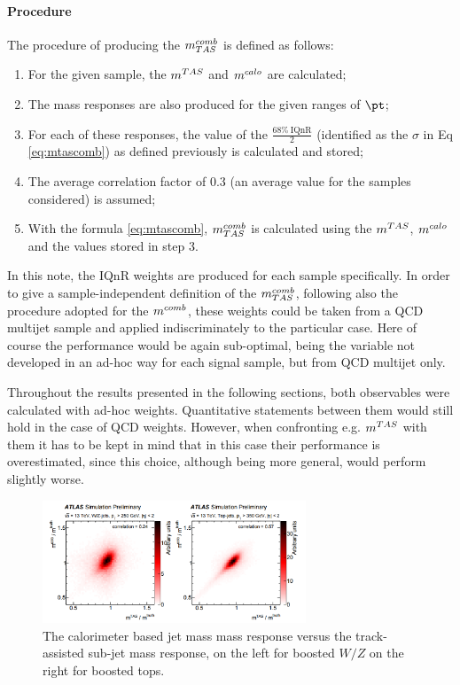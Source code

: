 \paragraph{Procedure}
The procedure of producing the $m^{comb}_{TAS}$ is defined as follows:
\begin{enumerate}
 \item For the given sample, the $\mtas$ and $\mcal$ are calculated;
 \item The mass responses are also produced for the given ranges of $\pt$;
 \item For each of these responses, the value of the $\frac{68\% \: \textrm{IQnR}}{2}$ (identified as the $\sigma$ in Eq \ref{eq:mtascomb}) as defined previously is calculated and stored;
 \item The average correlation factor of 0.3 (an average value for the samples considered) is assumed;
 \item With the formula \ref{eq:mtascomb}, $m^{comb}_{TAS}$ is calculated using the $\mtas$, $\mcal$ and the values stored in step 3.
\end{enumerate}


In this note, the IQnR weights are produced for each sample specifically. In order to give a sample-independent definition of the $m^{comb}_{TAS}$, following also the procedure adopted for the $m^{comb}$, these weights could be taken from a QCD multijet sample and applied indiscriminately to the particular case. Here of course the performance would be again sub-optimal, being the variable not developed in an ad-hoc way for each signal sample, but from QCD multijet only.

Throughout the results presented in the following sections, both observables were calculated with ad-hoc weights. Quantitative statements between them would still hold in the case of QCD weights. However, when confronting e.g. $\mtas$ with them it has to be kept in mind that in this case their performance is overestimated, since this choice, although being more general, would perform slightly worse.

\begin{figure}[!ht]
  \centering
      \includegraphics[width=0.7\textwidth]{jet_part/mcomb/mcomb2.png}
  \caption[$\mcal$ and $\mtas$ correlation plots]{The calorimeter based jet mass mass response versus the track-assisted sub-jet mass response, on the left for boosted $W/Z$ on the right for boosted tops.}
  \label{fig:mcomb2}
\end{figure}



